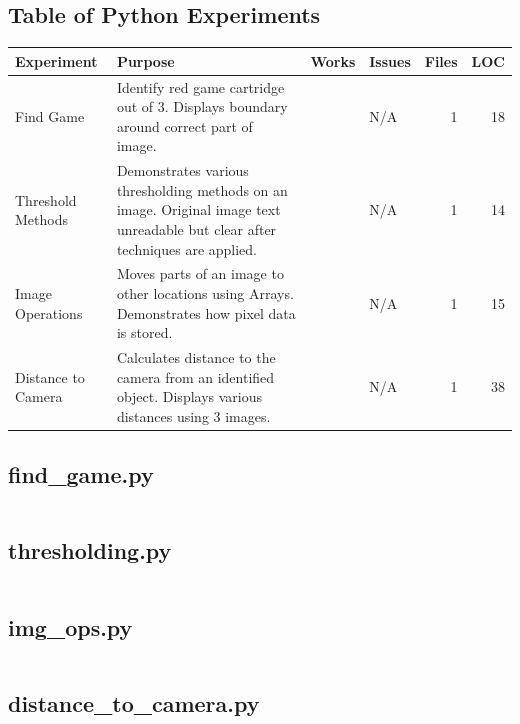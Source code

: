 		\subsection{Table of Python Experiments}
		\begin{table}[h!]
			\centering
			\label{tab:python_experiments}
			\begin{tabular}{|l|p{}|l|l|r|r|}
				\hline
				\rowcolor{gray!50}
				\bfseries Experiment&\bfseries Purpose&\bfseries Works&\bfseries Issues&\bfseries Files&\bfseries LOC\\
				\hline
				Find Game&
				Identify red game cartridge out of 3. Displays boundary around correct part of image.&
				\checkmark&
				N/A&
				1&
				18\\
				Threshold Methods&
				Demonstrates various thresholding methods on an image. Original image text unreadable but clear after techniques are applied.&
				\checkmark&
				N/A&
				1&
				14\\
				Image Operations&
				Moves parts of an image to other locations using Arrays. Demonstrates how pixel data is stored.&
				\checkmark&
				N/A&
				1&
				15\\
				Distance to Camera&
				Calculates distance to the camera from an identified object. Displays various distances using 3 images.&
				\checkmark&
				N/A&
				1&
				38\\
				\hline
			\end{tabular}
		\end{table}
		\subsection{find\_game.py}
		\inputminted[breaklines,
						linenos,
						frame=lines,
						fontsize=\footnotesize]{python}{../code/python/find_game.py}
		\subsection{thresholding.py}
		\inputminted[breaklines,
						linenos,
						frame=lines,
						fontsize=\footnotesize]{python}{../code/python/thresholding.py}
		\subsection{img\_ops.py}
		\inputminted[breaklines,
						linenos,
						frame=lines,
						fontsize=\footnotesize]{python}{../code/python/img_ops.py}
		\subsection{distance\_to\_camera.py}
		\inputminted[breaklines,
						linenos,
						frame=lines,
						fontsize=\footnotesize]{python}{../code/python/distance_to_camera.py}
\clearpage
